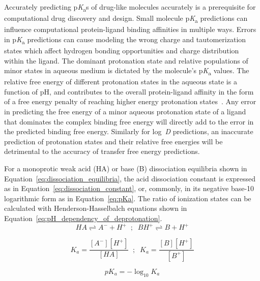 \documentclass[9pt,lineno,final]{elife}
\newcommand{\pKa}{p\textit{K}\textsubscript{a}}
\newcommand{\logD}{log~\textit{D}}
\begin{document}
Accurately predicting \pKa{}s of drug-like molecules accurately is a prerequisite for computational drug discovery and design.
Small molecule \pKa{} predictions can influence computational protein-ligand binding affinities in multiple ways. 
Errors in \pKa{} predictions can cause modeling the wrong charge and tautomerization states which affect hydrogen bonding opportunities and charge distribution within  the ligand.
The dominant protonation state and relative populations of minor states in aqueous medium is dictated by the molecule's \pKa{} values. 
The relative free energy of different protonation states in the aqueous state is a function of pH, and contributes to the overall protein-ligand affinity in the form of a free energy penalty of reaching higher energy protonation states~\citep{deOliveira:2019:J.Chem.TheoryComput.}.
Any error in predicting the free energy of a minor aqueous protonation state of a ligand that dominates the complex binding free energy will directly add to the error in the predicted binding free energy. 
Similarly for \logD{} predictions, an inaccurate prediction of protonation states and their relative free energies will be detrimental to the accuracy of transfer free energy predictions.

For a monoprotic weak acid (HA) or base (B) dissociation equilibria shown in Equation~\ref{eq:dissociation_equilibria}, the acid dissociation constant is expressed as in Equation~\ref{eq:dissociation_constant}, or, commonly, in its negative base-10 logarithmic form as in Equation~\ref{eq:pKa}. 
The ratio of ionization states can be calculated with Henderson-Hasselbalch equations shown in Equation~\ref{eq:pH_dependency_of_deprotonation}. 
\begin{equation}
HA \rightleftharpoons A^- + H^+ \;\; ; \;\; BH^+ \rightleftharpoons B + H^+
\label{eq:dissociation_equilibria}
\end{equation}

\begin{equation}
K_a = \frac{[A^-][H^+]}{[HA]}\;\; ; \;\;K_a = \frac{[B][H^+]}{[B^+]} 
\label{eq:dissociation_constant}
\end{equation}

\begin{equation}
pK_a = -\log_{10}{K_a}
\label{eq:pKa}
\end{equation}
\end{document}
